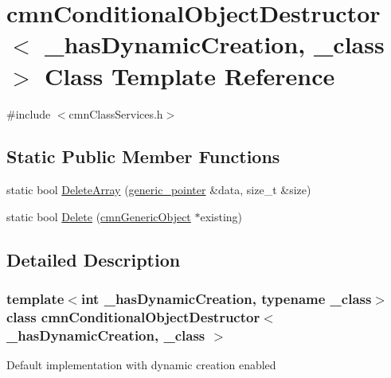 \hypertarget{classcmn_conditional_object_destructor}{\section{cmn\-Conditional\-Object\-Destructor$<$ \-\_\-has\-Dynamic\-Creation, \-\_\-class $>$ Class Template Reference}
\label{classcmn_conditional_object_destructor}
}


{\ttfamily \#include $<$cmn\-Class\-Services.\-h$>$}

\subsection*{Static Public Member Functions}
\begin{DoxyCompactItemize}
\item 
static bool \hyperlink{classcmn_conditional_object_destructor_a06fad8de84abc650a73ce8adc7edf2a9}{Delete\-Array} (\hyperlink{classcmn_generic_object}{generic\-\_\-pointer} \&data, size\-\_\-t \&size)
\item 
static bool \hyperlink{classcmn_conditional_object_destructor_a406a9967de6c2eb7a7996f00976cd885}{Delete} (\hyperlink{classcmn_generic_object}{cmn\-Generic\-Object} $\ast$existing)
\end{DoxyCompactItemize}


\subsection{Detailed Description}
\subsubsection*{template$<$int \-\_\-has\-Dynamic\-Creation, typename \-\_\-class$>$class cmn\-Conditional\-Object\-Destructor$<$ \-\_\-has\-Dynamic\-Creation, \-\_\-class $>$}

Default implementation with dynamic creation enabled 

